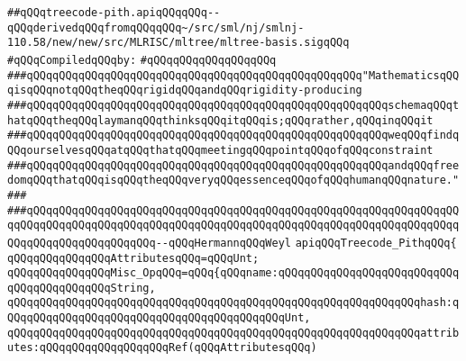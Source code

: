\label{src/lib/compiler/back/low/treecode/treecode-pith.api}
\verb|##qQQqtreecode-pith.apiqQQqqQQq--qQQqderivedqQQqfromqQQqqQQq~/src/sml/nj/smlnj-110.58/new/new/src/MLRISC/mltree/mltree-basis.sigqQQq|\newline
\newline
\verb|#qQQqCompiledqQQqby:|\newline
\verb|#qQQqqQQqqQQqqQQqqQQq|\newline
\newline
\newline
\newline
\verb|###qQQqqQQqqQQqqQQqqQQqqQQqqQQqqQQqqQQqqQQqqQQqqQQqqQQq"MathematicsqQQqisqQQqnotqQQqtheqQQqrigidqQQqandqQQqrigidity-producing|\newline
\verb|###qQQqqQQqqQQqqQQqqQQqqQQqqQQqqQQqqQQqqQQqqQQqqQQqqQQqqQQqschemaqQQqthatqQQqtheqQQqlaymanqQQqthinksqQQqitqQQqis;qQQqrather,qQQqinqQQqit|\newline
\verb|###qQQqqQQqqQQqqQQqqQQqqQQqqQQqqQQqqQQqqQQqqQQqqQQqqQQqqQQqweqQQqfindqQQqourselvesqQQqatqQQqthatqQQqmeetingqQQqpointqQQqofqQQqconstraint|\newline
\verb|###qQQqqQQqqQQqqQQqqQQqqQQqqQQqqQQqqQQqqQQqqQQqqQQqqQQqqQQqandqQQqfreedomqQQqthatqQQqisqQQqtheqQQqveryqQQqessenceqQQqofqQQqhumanqQQqnature."|\newline
\verb|###|\newline
\verb|###qQQqqQQqqQQqqQQqqQQqqQQqqQQqqQQqqQQqqQQqqQQqqQQqqQQqqQQqqQQqqQQqqQQqqQQqqQQqqQQqqQQqqQQqqQQqqQQqqQQqqQQqqQQqqQQqqQQqqQQqqQQqqQQqqQQqqQQqqQQqqQQqqQQqqQQqqQQqqQQq--qQQqHermannqQQqWeyl|\newline
\newline
\newline
\newline
\verb|apiqQQqTreecode_PithqQQq{|\newline
\newline
\verb|qQQqqQQqqQQqqQQqAttributesqQQq=qQQqUnt;|\newline
\newline
\verb|qQQqqQQqqQQqqQQqMisc_OpqQQq=qQQq{qQQqname:qQQqqQQqqQQqqQQqqQQqqQQqqQQqqQQqqQQqqQQqqQQqString,|\newline
\verb|qQQqqQQqqQQqqQQqqQQqqQQqqQQqqQQqqQQqqQQqqQQqqQQqqQQqqQQqqQQqqQQqhash:qQQqqQQqqQQqqQQqqQQqqQQqqQQqqQQqqQQqqQQqqQQqUnt,|\newline
\verb|qQQqqQQqqQQqqQQqqQQqqQQqqQQqqQQqqQQqqQQqqQQqqQQqqQQqqQQqqQQqqQQqattributes:qQQqqQQqqQQqqQQqqQQqRef(qQQqAttributesqQQq)|\newline
